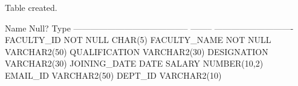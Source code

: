 \begin{sqlout}
Table created.

 Name                                      Null?    Type
 ----------------------------------------- -------- ----------------------------
 FACULTY_ID                                NOT NULL CHAR(5)
 FACULTY_NAME                              NOT NULL VARCHAR2(50)
 QUALIFICATION                                      VARCHAR2(30)
 DESIGNATION                                        VARCHAR2(30)
 JOINING_DATE                                       DATE
 SALARY                                             NUMBER(10,2)
 EMAIL_ID                                           VARCHAR2(50)
 DEPT_ID                                            VARCHAR2(10)
\end{sqlout}

\clearpage
